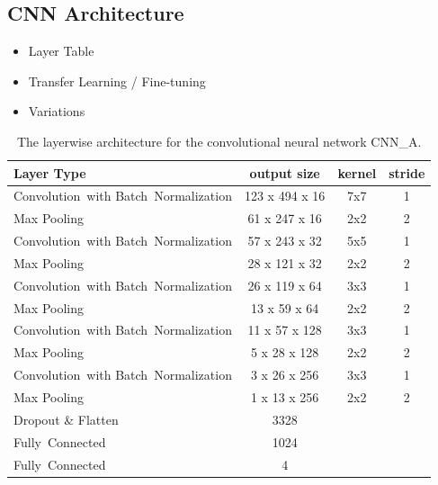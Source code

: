 \subsection{CNN Architecture}
\label{sec:cnn_architecture}


    \begin{itemize}
        \item Layer Table
        \item Transfer Learning / Fine-tuning
        \item Variations
    \end{itemize}
    
  \begin{table}[h]
  \centering
  \begin{tabularx}{\textwidth}{Xccc}
  \toprule
Layer Type                                          & output size    & kernel & stride  \\ \midrule
\mbox{Convolution with} \mbox{Batch Normalization}  & 123 x 494 x 16 & 7x7    & 1       \\ 
Max Pooling                                         & 61 x 247 x 16  & 2x2    & 2       \\ 
\mbox{Convolution with} \mbox{Batch Normalization}  & 57 x 243 x 32  & 5x5    & 1       \\ 
Max Pooling                                         & 28 x 121 x 32  & 2x2    & 2       \\ 
\mbox{Convolution with} \mbox{Batch Normalization}  & 26 x 119 x 64  & 3x3    & 1       \\ 
Max Pooling                                         & 13 x 59 x 64   & 2x2    & 2       \\ 
\mbox{Convolution with} \mbox{Batch Normalization}  & 11 x 57 x 128  & 3x3    & 1       \\ 
Max Pooling                                         & 5 x 28 x 128   & 2x2    & 2       \\ 
\mbox{Convolution with} \mbox{Batch Normalization}  & 3 x 26 x 256   & 3x3    & 1       \\ 
Max Pooling                                         & 1 x 13 x 256   & 2x2    & 2       \\ 
Dropout \& Flatten                                  & 3328           &        &         \\ 
\mbox{Fully Connected}                              & 1024           &        &         \\ 
\mbox{Fully Connected}                              & 4              &        &         \\ 
  \bottomrule
  \end{tabularx}
  \caption{The layerwise architecture for the convolutional neural network CNN\_A.}
  \label{tab:layers_CNN_A}
  \end{table}
    

